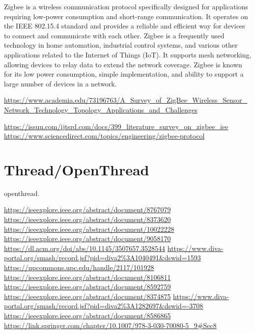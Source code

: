 Zigbee is a wireless communication protocol specifically designed for
applications requiring low-power consumption and short-range communication.
It operates on the IEEE 802.15.4 standard and provides a reliable and efficient way
for devices to connect and communicate with each other.
Zigbee is a frequently used technology in home automation, industrial control systems,
and various other applications related to the Internet of Things (IoT).
It supports mesh networking, allowing devices to relay data to extend the network
coverage. Zigbee is known for its low power consumption, simple implementation, and
ability to support a large number of devices in a network.

\url{https://www.academia.edu/73196763/A_Survey_of_ZigBee_Wireless_Sensor_Network_Technology_Topology_Applications_and_Challenges}

\url{https://issuu.com/ijtsrd.com/docs/399_literature_survey_on_zigbee_iee}
\url{https://www.sciencedirect.com/topics/engineering/zigbee-protocol}

\section{Thread/OpenThread}
\label{sec:ot}
openthread.

\url{https://ieeexplore.ieee.org/abstract/document/8767079}
\url{https://ieeexplore.ieee.org/abstract/document/8373620}
\url{https://ieeexplore.ieee.org/abstract/document/10022228}
\url{https://ieeexplore.ieee.org/abstract/document/9058170}
\url{https://dl.acm.org/doi/abs/10.1145/3507657.3528544}
\url{https://www.diva-portal.org/smash/record.jsf?pid=diva2%3A1040491&dswid=1593}
\url{https://upcommons.upc.edu/handle/2117/101928}
\url{https://ieeexplore.ieee.org/abstract/document/8106811}
\url{https://ieeexplore.ieee.org/abstract/document/8592759}
\url{https://ieeexplore.ieee.org/abstract/document/8374875}
\url{https://www.diva-portal.org/smash/record.jsf?pid=diva2%3A1282697&dswid=-3708}
\url{https://ieeexplore.ieee.org/abstract/document/8586865}
\url{https://link.springer.com/chapter/10.1007/978-3-030-70080-5_9#Sec8}